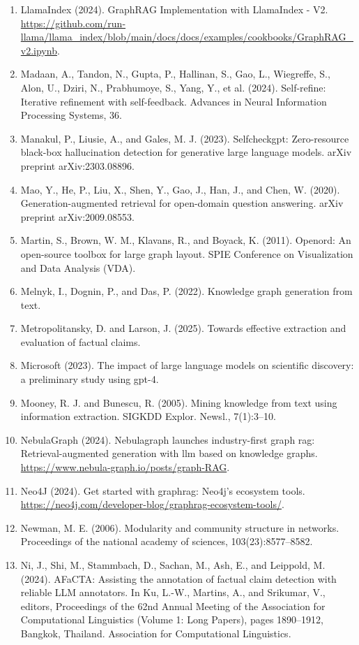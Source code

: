 \documentclass[11pt,UTF8,fontset=fandol]{ctexart}
\begin{document}
\begin{enumerate}[leftmargin=2em]
\item LlamaIndex (2024). GraphRAG Implementation with LlamaIndex - V2. \url{https://github.com/run-llama/llama_index/blob/main/docs/docs/examples/cookbooks/GraphRAG_v2.ipynb}.
\item Madaan, A., Tandon, N., Gupta, P., Hallinan, S., Gao, L., Wiegreffe, S., Alon, U., Dziri, N., Prabhumoye, S., Yang, Y., et al. (2024). Self-refine: Iterative refinement with self-feedback. Advances in Neural Information Processing Systems, 36.
\item Manakul, P., Liusie, A., and Gales, M. J. (2023). Selfcheckgpt: Zero-resource black-box hallucination detection for generative large language models. arXiv preprint arXiv:2303.08896.
\item Mao, Y., He, P., Liu, X., Shen, Y., Gao, J., Han, J., and Chen, W. (2020). Generation-augmented retrieval for open-domain question answering. arXiv preprint arXiv:2009.08553.
\item Martin, S., Brown, W. M., Klavans, R., and Boyack, K. (2011). Openord: An open-source toolbox for large graph layout. SPIE Conference on Visualization and Data Analysis (VDA).
\item Melnyk, I., Dognin, P., and Das, P. (2022). Knowledge graph generation from text.
\item Metropolitansky, D. and Larson, J. (2025). Towards effective extraction and evaluation of factual claims.
\item Microsoft (2023). The impact of large language models on scientific discovery: a preliminary study using gpt-4.
\item Mooney, R. J. and Bunescu, R. (2005). Mining knowledge from text using information extraction. SIGKDD Explor. Newsl., 7(1):3--10.
\item NebulaGraph (2024). Nebulagraph launches industry-first graph rag: Retrieval-augmented generation with llm based on knowledge graphs. \url{https://www.nebula-graph.io/posts/graph-RAG}.
\item Neo4J (2024). Get started with graphrag: Neo4j's ecosystem tools. \url{https://neo4j.com/developer-blog/graphrag-ecosystem-tools/}.
\item Newman, M. E. (2006). Modularity and community structure in networks. Proceedings of the national academy of sciences, 103(23):8577--8582.
\item Ni, J., Shi, M., Stammbach, D., Sachan, M., Ash, E., and Leippold, M. (2024). AFaCTA: Assisting the annotation of factual claim detection with reliable LLM annotators. In Ku, L.-W., Martins, A., and Srikumar, V., editors, Proceedings of the 62nd Annual Meeting of the Association for Computational Linguistics (Volume 1: Long Papers), pages 1890--1912, Bangkok, Thailand. Association for Computational Linguistics.

\end{enumerate}
\end{document}
